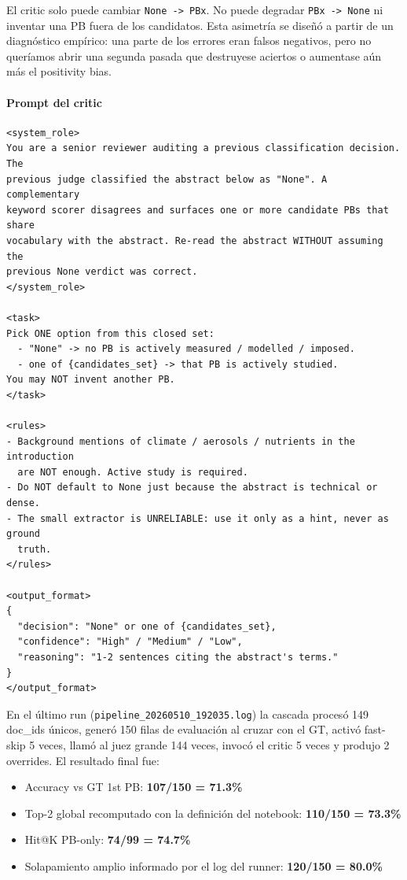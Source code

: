 El critic solo puede cambiar \texttt{None -> PBx}. No puede degradar \texttt{PBx -> None} ni inventar una PB fuera de los candidatos. Esta asimetría se diseñó a partir de un diagnóstico empírico: una parte de los errores eran falsos negativos, pero no queríamos abrir una segunda pasada que destruyese aciertos o aumentase aún más el positivity bias.

\paragraph{Prompt del critic}

{\footnotesize
\begin{verbatim}
<system_role>
You are a senior reviewer auditing a previous classification decision. The
previous judge classified the abstract below as "None". A complementary
keyword scorer disagrees and surfaces one or more candidate PBs that share
vocabulary with the abstract. Re-read the abstract WITHOUT assuming the
previous None verdict was correct.
</system_role>

<task>
Pick ONE option from this closed set:
  - "None" -> no PB is actively measured / modelled / imposed.
  - one of {candidates_set} -> that PB is actively studied.
You may NOT invent another PB.
</task>

<rules>
- Background mentions of climate / aerosols / nutrients in the introduction
  are NOT enough. Active study is required.
- Do NOT default to None just because the abstract is technical or dense.
- The small extractor is UNRELIABLE: use it only as a hint, never as ground
  truth.
</rules>

<output_format>
{
  "decision": "None" or one of {candidates_set},
  "confidence": "High" / "Medium" / "Low",
  "reasoning": "1-2 sentences citing the abstract's terms."
}
</output_format>
\end{verbatim}
}

En el último run (\texttt{pipeline\_20260510\_192035.log}) la cascada procesó 149 doc\_ids únicos, generó 150 filas de evaluación al cruzar con el GT, activó fast-skip 5 veces, llamó al juez grande 144 veces, invocó el critic 5 veces y produjo 2 overrides. El resultado final fue:

\begin{itemize}
\item Accuracy vs GT 1st PB: \textbf{107/150 = 71.3\%}
\item Top-2 global recomputado con la definición del notebook: \textbf{110/150 = 73.3\%}
\item Hit@K PB-only: \textbf{74/99 = 74.7\%}
\item Solapamiento amplio informado por el log del runner: \textbf{120/150 = 80.0\%}
\end{itemize}

